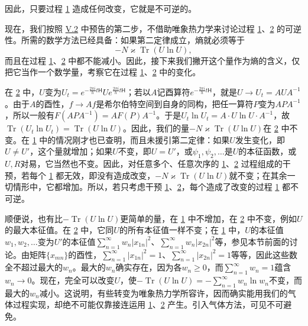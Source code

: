 \documentclass[fontsize=13pt,twoside,openany,headings=normal,parskip=false,bookmarkpackage=false,DIV=calc]{scrbook}
\begin{document}
因此，只要过程 \hyperref[eq:V.1.1]{1} 造成任何改变，它就是不可逆的。

现在，我们按照 \hyperref[sec:V.2]{V.2} 中预告的第二步，不借助唯象热力学来讨论过程 \hyperref[eq:V.1.1]{1}、\hyperref[eq:V.1.2]{2} 的可逆性。所需的数学方法已经具备：如果第二定律成立，熵就必须等于
\[
-N\varkappa\operatorname{Tr}(U\ln U),
\]
而且在过程 \hyperref[eq:V.1.1]{1}、\hyperref[eq:V.1.2]{2} 中都不能减小。因此，接下来我们撇开这个量作为熵的含义，仅把它当作一个数学量，考察它在过程 \hyperref[eq:V.1.1]{1}、\hyperref[eq:V.1.2]{2} 中的变化。

在 \hyperref[eq:V.1.2]{2} 中，$U$变为$U_t=e^{-\frac{2\pi i}{h}t\mathsf{H}}Ue^{\frac{2\pi i}{h}t\mathsf{H}}$；若以$A$记酉算符$e^{-\frac{2\pi i}{h}t\mathsf{H}}$，就是$U\to U_t=AUA^{-1}$。由于$A$的酉性，$f\to Af$是希尔伯特空间到自身的同构，把任一算符$P$变为$APA^{-1}$，所以一般有$F(APA^{-1})=AF(P)A^{-1}$。于是$U_t\ln U_t=A\cdot U\ln U\cdot A^{-1}$，故$\operatorname{Tr}(U_t\ln U_t)=\operatorname{Tr}(U\ln U)$。因此，我们的量$-N\varkappa\operatorname{Tr}(U\ln U)$在 \hyperref[eq:V.1.2]{2} 中不变。在 \hyperref[eq:V.1.1]{1} 中的情况刚才也已查明，而且未援引第二定律：如果$U$发生变化，即$U\ne U'$，这个量就增加；如果$U$不变，即$U=U'$，或$\psi_1,\allowbreak \psi_2,\allowbreak \ldots$是$U$的本征函数，或$U,\allowbreak R$对易，它当然也不变。因此，对任意多个、任意次序的 \hyperref[eq:V.1.1]{1}、\hyperref[eq:V.1.2]{2} 过程组成的干预，若每个 \hyperref[eq:V.1.1]{1} 都无效，即没有造成改变，$-N\varkappa\operatorname{Tr}(U\ln U)$就不变；在其余一切情形中，它都增加。\hypertarget{origpage-207}{}\label{origpage-207}所以，若只考虑干预 \hyperref[eq:V.1.1]{1}、\hyperref[eq:V.1.2]{2}，每个造成了改变的过程 \hyperref[eq:V.1.1]{1} 都不可逆。

顺便说，也有比$-\operatorname{Tr}(U\ln U)$更简单的量，在 \hyperref[eq:V.1.1]{1} 中不增加，在 \hyperref[eq:V.1.2]{2} 中不变，例如$U$的最大本征值。在 \hyperref[eq:V.1.2]{2} 中，它同$U$的所有本征值一样不变；在 \hyperref[eq:V.1.1]{1} 中，$U$的本征值$w_1,\allowbreak w_2,\allowbreak \ldots$变为$U'$的本征值$\sum_{n=1}^{\infty}w_n|x_{1n}|^2$、$\sum_{n=1}^{\infty}w_n|x_{2n}|^2$等，参见本节前面的讨论。由矩阵$\{x_{mn}\}$的酉性，$\sum_{n=1}^{\infty}|x_{1n}|^2=1$、$\sum_{n=1}^{\infty}|x_{2n}|^2=1$等等，因此这些数全不超过最大的$w_n$。最大的$w_n$确实存在，因为各$w_n\geq0$，而$\sum_{n=1}^{\infty}w_n=1$蕴含$w_n\to0$。现在，完全可以改变$U$，使$-\operatorname{Tr}(U\ln U)=-\sum_{n=1}^{\infty}w_n\ln w_n$不变，而最大的$w_n$减小。这说明，有些转变为唯象热力学所容许，因而确实能用我们的气体过程实现，却绝不可能仅靠接连运用 \hyperref[eq:V.1.1]{1}、\hyperref[eq:V.1.2]{2} 产生。引入气体方法，可见不可避免。
\end{document}
